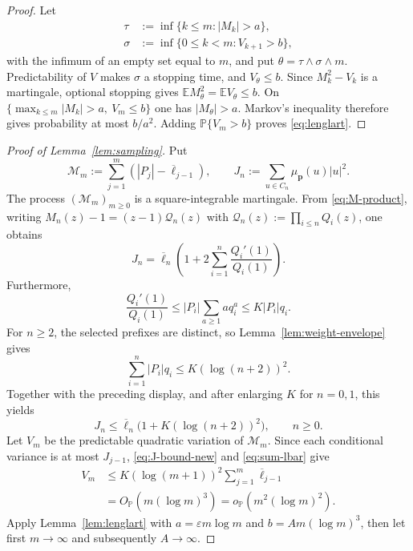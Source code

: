\documentclass[journal]{IEEEtran}
\theoremstyle{plain}
\theoremstyle{definition}
\theoremstyle{remark}
\newcommand{\Pideal}{\mathbb P}
\newcommand{\muP}{\mu_{\mathbf p}}
\newcommand{\lbar}{\overline\ell}
\begin{document}
\begin{proof}
Let
\begin{align*}
 \tau&:=\inf\{k\le m:|M_k|>a\},\\
 \sigma&:=\inf\{0\le k<m:V_{k+1}>b\},
\end{align*}
with the infimum of an empty set equal to $m$, and put $\theta=\tau\wedge\sigma\wedge m$.  Predictability of $V$ makes $\sigma$ a stopping time, and $V_\theta\le b$.  Since $M_k^2-V_k$ is a martingale, optional stopping gives $\mathbb E M_\theta^2=\mathbb E V_\theta\le b$.  On $\{\max_{k\le m}|M_k|>a,\ V_m\le b\}$ one has $|M_\theta|>a$.  Markov's inequality therefore gives probability at most $b/a^2$.  Adding $\mathbb P\{V_m>b\}$ proves \eqref{eq:lenglart}.
\end{proof}

\begin{proof}[Proof of Lemma~\ref{lem:sampling}]
Put
\begin{equation*}
 \mathcal M_m:=\sum_{j=1}^m(|P_j|-\lbar_{j-1}),
 \qquad
 J_n:=\sum_{u\in C_n}\muP(u)|u|^2.
\end{equation*}
The process $(\mathcal M_m)_{m\ge0}$ is a square-integrable martingale.  From \eqref{eq:M-product}, writing
$M_n(z)-1=(z-1)\mathcal Q_n(z)$ with $\mathcal Q_n(z):=\prod_{i\le n}Q_i(z)$, one obtains
\begin{equation*}
 J_n=\lbar_n\left(1+2\sum_{i=1}^n\frac{Q_i'(1)}{Q_i(1)}\right).
\end{equation*}
Furthermore,
\begin{equation*}
 \frac{Q_i'(1)}{Q_i(1)}
 \le |P_i|\sum_{a\ge1}a q_i^a
 \le K|P_i|q_i.
\end{equation*}
For $n\ge2$, the selected prefixes are distinct, so Lemma~\ref{lem:weight-envelope} gives
\begin{equation*}
 \sum_{i=1}^n|P_i|q_i\le K(\log(n+2))^2.
\end{equation*}
Together with the preceding display, and after enlarging $K$ for $n=0,1$, this yields
\begin{equation}\label{eq:J-bound-new}
 J_n\le\lbar_n\bigl(1+K(\log(n+2))^2\bigr),
 \qquad n\ge0.
\end{equation}
Let $V_m$ be the predictable quadratic variation of $\mathcal M_m$.  Since each conditional variance is at most $J_{j-1}$, \eqref{eq:J-bound-new} and \eqref{eq:sum-lbar} give
\begin{align*}
 V_m
 &\le K(\log(m+1))^2\sum_{j=1}^m\lbar_{j-1}\\
 &=O_{\Pideal}(m(\log m)^3)
 =o_{\Pideal}(m^2(\log m)^2).
\end{align*}
Apply Lemma~\ref{lem:lenglart} with $a=\varepsilon m\log m$ and
$b=A m(\log m)^3$, then let first $m\to\infty$ and subsequently $A\to\infty$.
\end{proof}
\end{document}

